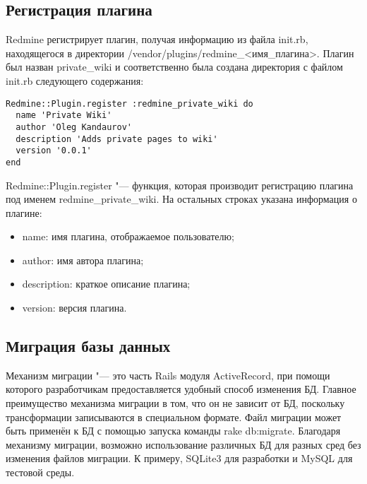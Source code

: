 \subsection{Регистрация плагина}
Redmine регистрирует плагин, получая информацию из файла init.rb, находящегося
в директории /vendor/plugins/redmine\_<имя\_плагина>. Плагин был назван
private\_wiki и соответственно была создана директория с файлом init.rb
следующего содержания:
\small{\begin{lstlisting}
Redmine::Plugin.register :redmine_private_wiki do
  name 'Private Wiki'
  author 'Oleg Kandaurov'
  description 'Adds private pages to wiki'
  version '0.0.1'
end
\end{lstlisting}}
Redmine::Plugin.register "--- функция, которая производит регистрацию плагина
под именем redmine\_private\_wiki. На остальных строках указана информация о
плагине:
\begin{itemize} 
  \item name: имя плагина, отображаемое пользователю;
  \item author: имя автора плагина;
  \item description: краткое описание плагина;
  \item version: версия плагина.
\end{itemize}

\subsection{Миграция базы данных} 
Механизм миграции "--- это часть Rails модуля ActiveRecord, при помощи которого
разработчикам предоставляется удобный способ изменения БД. Главное преимущество
механизма миграции в том, что он не зависит от БД, поскольку трансформации
записываются в специальном формате. Файл миграции может быть применён к
БД с помощью запуска команды rake db:migrate. Благодаря механизму миграции,
возможно использование различных БД для разных сред без изменения файлов
миграции. К примеру, SQLite3 для разработки и MySQL для тестовой среды.

